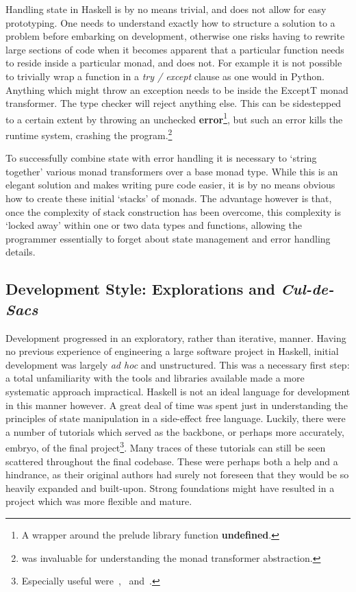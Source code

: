 \documentclass[12pt, a4paper]{report}
\begin{document}
Handling state in Haskell is by no means trivial, and does not allow for easy prototyping. One needs
to understand exactly how to structure a solution to a problem before embarking on development,
otherwise one risks having to rewrite large sections of code when it becomes apparent that a
particular function needs to reside inside a particular monad, and does not. For example it is not
possible to trivially wrap a function in a \textit{try / except} clause as one would in Python.
Anything which might throw an exception needs to be inside the ExceptT monad transformer. The type
checker will reject anything else. This can be sidestepped to a certain extent by throwing an
unchecked \textbf{error}\footnote{A wrapper around the prelude library function \textbf{undefined}.},
but such an error kills the runtime system, crashing the program.\footnote{\cite{transformers} was
invaluable for understanding the monad transformer abstraction.}

To successfully combine state with error handling it is necessary to `string together' various monad
transformers over a base monad type. While this is an elegant solution and makes writing pure code
easier, it is by no means obvious how to create these initial `stacks' of monads. The advantage
however is that, once the complexity of stack construction has been overcome, this complexity is
`locked away' within one or two data types and functions, allowing the programmer essentially to
forget about state management and error handling details. 

\subsection{Development Style: Explorations and \textit{Cul-de-Sacs}}
\label{deadend}
Development progressed in an exploratory, rather than iterative, manner. Having no previous
experience of engineering a large software project in Haskell, initial development was largely
\textit{ad hoc} and unstructured. This was a necessary first step: a total unfamiliarity with the
tools and libraries available made a more systematic approach impractical. Haskell is not an ideal
language for development in this manner however. A great deal of time was spent just in understanding the
principles of state manipulation in a side-effect free language. Luckily, there were a number of
tutorials which served as the backbone, or perhaps more accurately, embryo, of the final
project\footnote{Especially useful were~\cite{algoW},~\cite{scheme } and~\cite{diehl}.}.
Many traces of these tutorials can still be seen scattered throughout the final codebase. These were
perhaps both a help and a hindrance, as their original authors had surely not foreseen that they
would be so heavily expanded and built-upon. Strong foundations might have resulted in a project
which was more flexible and mature.
\end{document}
